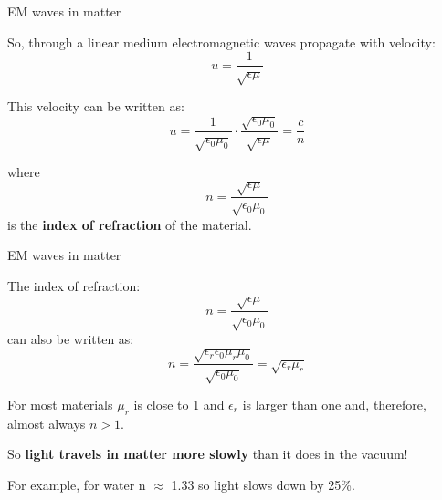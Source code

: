 %
%
%

\begin{frame}{EM waves in matter}

So, through a linear medium electromagnetic waves propagate
with velocity:
\begin{equation*}
   u = \frac{1}{\sqrt{\epsilon \mu}}
\end{equation*}

This velocity can be written as:
\begin{equation*}
   u = \frac{1}{\sqrt{\epsilon_0 \mu_0}} \cdot
          \frac{\sqrt{\epsilon_0 \mu_0}}{\sqrt{\epsilon \mu}}
      = \frac{c}{n}
\end{equation*}

where
\begin{equation*}
   n = \frac{\sqrt{\epsilon \mu}}{\sqrt{\epsilon_0 \mu_0}}
\end{equation*}
is the {\bf index of refraction} of the material.

\end{frame}

%
%
%

\begin{frame}{EM waves in matter}

The index of refraction:
\begin{equation*}
   n = \frac{\sqrt{\epsilon \mu}}{\sqrt{\epsilon_0 \mu_0}}
\end{equation*}
can also be written as:
\begin{equation*}
   n = \frac{\sqrt{\epsilon_r \epsilon_0 \mu_r
       \mu_0}}{\sqrt{\epsilon_0 \mu_0}} = \sqrt{\epsilon_r \mu_r}
\end{equation*}

For most materials $\mu_r$ is close to 1 and $\epsilon_r$ is
larger than one and, therefore, almost always $n > 1$.\\

\vspace{0.2cm}

So {\bf light travels in
matter more slowly} than it does in the vacuum!

\vspace{0.2cm}

For example, for water n $\approx$ 1.33 so light slows down by 25\%.

\end{frame}

%
%
%

